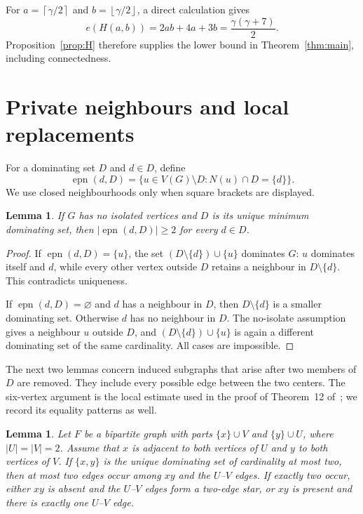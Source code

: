 \documentclass[11pt]{article}
\newtheorem{lemma}[theorem]{Lemma}
\theoremstyle{definition}
\theoremstyle{remark}
\newcommand{\epn}{\operatorname{epn}}
\newcommand{\e}{e}
\newcommand{\ceil}[1]{\left\lceil#1\right\rceil}
\newcommand{\floor}[1]{\left\lfloor#1\right\rfloor}
\begin{document}
For $a=\ceil{\gamma/2}$ and $b=\floor{\gamma/2}$, a direct calculation gives
\begin{equation}\label{eq:attain}
 \e(H(a,b))=2ab+4a+3b=\frac{\gamma(\gamma+7)}2.
\end{equation}
Proposition~\ref{prop:H} therefore supplies the lower bound in
Theorem~\ref{thm:main}, including connectedness.

\section{Private neighbours and local replacements}

For a dominating set $D$ and $d\in D$, define
\[
 \epn(d,D)=\{u\in V(G)\setminus D:N(u)\cap D=\{d\}\}.
\]
We use closed neighbourhoods only when square brackets are displayed.

\begin{lemma}\label{lem:private}
If $G$ has no isolated vertices and $D$ is its unique minimum dominating set,
then $|\epn(d,D)|\ge2$ for every $d\in D$.
\end{lemma}

\begin{proof}
If $\epn(d,D)=\{u\}$, the set $(D\setminus\{d\})\cup\{u\}$ dominates $G$:
$u$ dominates itself and $d$, while every other vertex outside $D$ retains a
neighbour in $D\setminus\{d\}$. This contradicts uniqueness.

If $\epn(d,D)=\varnothing$ and $d$ has a neighbour in $D$, then
$D\setminus\{d\}$ is a smaller dominating set. Otherwise $d$ has no neighbour
in $D$. The no-isolate assumption gives a neighbour $u$ outside $D$, and
$(D\setminus\{d\})\cup\{u\}$ is again a different dominating set of the same
cardinality. All cases are impossible.
\end{proof}

The next two lemmas concern induced subgraphs that arise after two members
of $D$ are removed. They include every possible edge between the two centers.
The six-vertex argument is the local estimate used in the proof of
Theorem~12 of~\cite{KN}; we record its equality patterns as well.

\begin{lemma}\label{lem:six}
Let $F$ be a bipartite graph with parts $\{x\}\cup V$ and $\{y\}\cup U$,
where $|U|=|V|=2$. Assume that $x$ is adjacent to both vertices of $U$ and
$y$ to both vertices of $V$. If $\{x,y\}$ is the unique dominating set of
cardinality at most two, then at most two edges occur among $xy$ and the
$U$--$V$ edges. If exactly two occur, either $xy$ is absent and the
$U$--$V$ edges form a two-edge star, or $xy$ is present and there is exactly
one $U$--$V$ edge.
\end{lemma}
\end{document}
